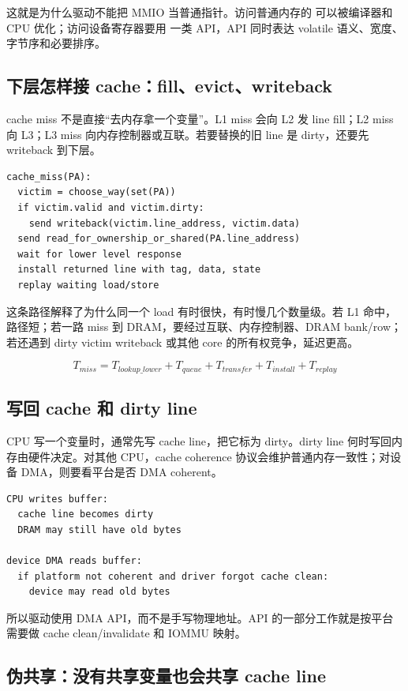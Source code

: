 这就是为什么驱动不能把 MMIO 当普通指针。访问普通内存的  可以被编译器和 CPU 优化；访问设备寄存器要用  一类 API，API 同时表达 volatile 语义、宽度、字节序和必要排序。

\subsection{下层怎样接 cache：fill、evict、writeback}

cache miss 不是直接“去内存拿一个变量”。L1 miss 会向 L2 发 line fill；L2 miss 向 L3；L3 miss 向内存控制器或互联。若要替换的旧 line 是 dirty，还要先 writeback 到下层。

\begin{lstlisting}
cache_miss(PA):
  victim = choose_way(set(PA))
  if victim.valid and victim.dirty:
    send writeback(victim.line_address, victim.data)
  send read_for_ownership_or_shared(PA.line_address)
  wait for lower level response
  install returned line with tag, data, state
  replay waiting load/store
\end{lstlisting}

这条路径解释了为什么同一个 load 有时很快，有时慢几个数量级。若 L1 命中，路径短；若一路 miss 到 DRAM，要经过互联、内存控制器、DRAM bank/row；若还遇到 dirty victim writeback 或其他 core 的所有权竞争，延迟更高。

\[
T_{miss} = T_{lookup\_lower}+T_{queue}+T_{transfer}+T_{install}+T_{replay}
\]

\subsection{写回 cache 和 dirty line}

CPU 写一个变量时，通常先写 cache line，把它标为 dirty。dirty line 何时写回内存由硬件决定。对其他 CPU，cache coherence 协议会维护普通内存一致性；对设备 DMA，则要看平台是否 DMA coherent。

\begin{lstlisting}
CPU writes buffer:
  cache line becomes dirty
  DRAM may still have old bytes

device DMA reads buffer:
  if platform not coherent and driver forgot cache clean:
    device may read old bytes
\end{lstlisting}

所以驱动使用 DMA API，而不是手写物理地址。API 的一部分工作就是按平台需要做 cache clean/invalidate 和 IOMMU 映射。

\subsection{伪共享：没有共享变量也会共享 cache line}

